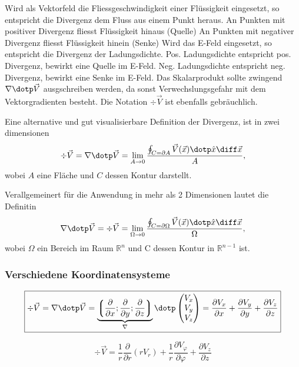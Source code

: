 \medskip
\begin{outline}
    \1 Wird als Vektorfeld die Fliessgeschwindigkeit einer Flüssigkeit eingesetzt, so entspricht die Divergenz dem Fluss aus einem Punkt heraus.
        \2 An Punkten mit positiver Divergenz fliesst Flüssigkeit hinaus (Quelle)
        \2 An Punkten mit negativer Divergenz fliesst Flüssigkeit hinein (Senke)
    \1 Wird das E-Feld eingesetzt, so entspricht die Divergenz der Ladungsdichte.
        \2 Pos. Ladungsdichte entspricht pos. Divergenz, bewirkt eine Quelle im E-Feld.
        \2 Neg. Ladungsdichte entspricht neg. Divergenz, bewirkt eine Senke im E-Feld.
    \1 Das Skalarprodukt sollte zwingend $\nabla \dotp \vec{V}$ ausgschreiben werden, da sonst Verwechslungsgefahr mit dem Vektorgradienten besteht.
    \1 Die Notation $ \div \vec{V}$ ist ebenfalls gebräuchlich.
\end{outline}

\medskip
Eine alternative und gut visualisierbare Definition der Divergenz, ist in zwei dimensionen
\[
    \div \vec{V} = \nabla\dotp\vec{V}  = \lim_{A \to 0}\frac{\oint_{C = \partial A} \vec{V}(\vec{x}) \dotp \hat{x} \diff \vec{x}}{A},
\]
wobei $A$ eine Fläche und $C$ dessen Kontur darstellt.

Verallgemeinert für die Anwendung in mehr als 2 Dimensionen lautet die Definitin
\[
    \nabla\dotp\vec{V} = \div \vec{V} = \lim_{\Omega \to 0}\frac{\oint_{C = \partial \Omega}\vec{V}(\vec{x}) \dotp \hat{x} \diff \vec{x}}{\Omega},
\]
wobei $\Omega$ ein Bereich im Raum $\mathbb{R}^n$ und C dessen Kontur in $\mathbb{R}^{n-1}$ ist.

\subsubsection{Verschiedene Koordinatensysteme}
\[
    \boxed{
        \div \vec{V}
        = \nabla\dotp\vec{V}
        = \underbrace{%
            \left\lgroup%
                \frac{\partial}{\partial x};\frac{\partial}{\partial y};\frac{\partial}{\partial z}%
            \right\rgroup}_{\nabla} \dotp 
        \begin{pmatrix}
            V_x \\ V_y \\ V_z
        \end{pmatrix}
        = \frac{\partial V_x}{\partial x} + \frac{\partial V_y}{\partial y} + \frac{\partial V_z}{\partial z}
    }
\]

\[
    \boxed{
        \div \vec{V} = \frac{1}{r} \frac{\partial}{\partial r} (rV_r) + \frac{1}{r} \frac{\partial V_\varphi}{\partial \varphi} + \frac{\partial V_z}{\partial z}
    }
\]


